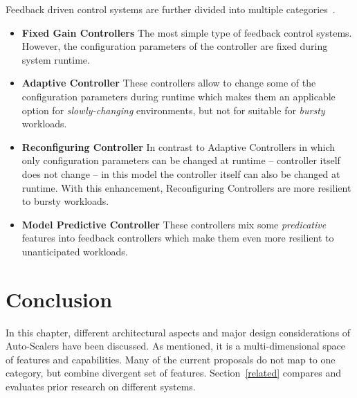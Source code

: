 Feedback driven control systems are further divided into multiple categories~\cite{Patikirikorala:2018}.
\begin{itemize}
    \item \textbf{Fixed Gain Controllers} The most simple type of feedback control systems. However, the configuration parameters of the controller are fixed during system runtime.
    \item \textbf{Adaptive Controller} These controllers allow to change some of the configuration parameters during runtime which makes them an applicable option for \emph{slowly-changing} environments, but not for suitable for \emph{bursty} workloads.
    \item \textbf{Reconfiguring Controller} In contrast to Adaptive Controllers in which only configuration parameters can be changed at runtime -- controller itself does not change -- in this model the controller itself can also be changed at runtime. With this enhancement, Reconfiguring Controllers are more resilient to bursty workloads.
    \item \textbf{Model Predictive Controller} These controllers mix some \emph{predicative} features into feedback controllers which make them even more resilient to unanticipated workloads.
\end{itemize}
\section{Conclusion}
\label{ias:conc}

In this chapter, different architectural aspects and major design considerations of Auto-Scalers have been discussed. As mentioned, it is a multi-dimensional space of features and capabilities. Many of the current proposals do not map to one category, but combine divergent set of features. Section~\ref{related} compares and evaluates prior research on different systems.